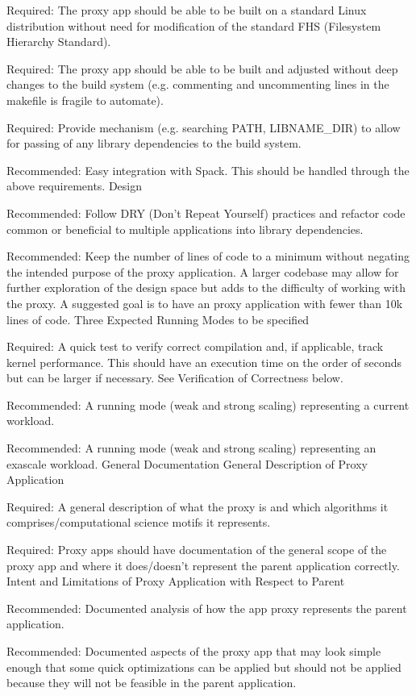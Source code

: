 Required: The proxy app should be able to be built on a standard Linux distribution without need for modification of the standard FHS (Filesystem Hierarchy Standard).

Required: The proxy app should be able to be built and adjusted without deep changes to the build system (e.g. commenting and uncommenting lines in the makefile is fragile to automate).

Required: Provide mechanism (e.g. searching PATH, LIBNAME_DIR) to allow for passing of any library dependencies to the build system.

Recommended: Easy integration with Spack. This should be handled through the above requirements.
Design

Recommended: Follow DRY (Don't Repeat Yourself) practices and refactor code common or beneficial to multiple applications into library dependencies.

Recommended: Keep the number of lines of code to a minimum without negating the intended purpose of the proxy application. A larger codebase may allow for further exploration of the design space but adds to the difficulty of working with the proxy. A suggested goal is to have an proxy application with fewer than 10k lines of code.
Three Expected Running Modes to be specified

Required: A quick test to verify correct compilation and, if applicable, track kernel performance. This should have an execution time on the order of seconds but can be larger if necessary. See Verification of Correctness below.

Recommended: A running mode (weak and strong scaling) representing a current workload.

Recommended: A running mode (weak and strong scaling) representing an exascale workload.
General Documentation
General Description of Proxy Application

Required: A general description of what the proxy is and which algorithms it comprises/computational science motifs it represents.

Required: Proxy apps should have documentation of the general scope of the proxy app and where it does/doesn't represent the parent application correctly.
Intent and Limitations of Proxy Application with Respect to Parent

Recommended: Documented analysis of how the app proxy represents the parent application.

Recommended: Documented aspects of the proxy app that may look simple enough that some quick optimizations can be applied but should not be applied because they will not be feasible in the parent application.

